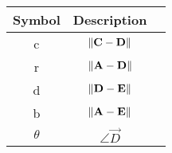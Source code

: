 \begin{tabular}{|c|c|c|}
\hline
Symbol & Description\\
\hline
c & $\left\lVert\mathbf{C} -\mathbf{D}\right\rVert$ \\
\hline
r & $\left\lVert\mathbf{A} -\mathbf{D}\right\rVert$ \\
\hline
d & $\left\lVert\mathbf{D} - \mathbf{E}\right\rVert$\\
\hline
b & $\left\lVert\mathbf{A} - \mathbf{E}\right\rVert$\\
\hline
$\theta$ & $\angle{\vec{D}}$ \\
\hline
\end{tabular}
